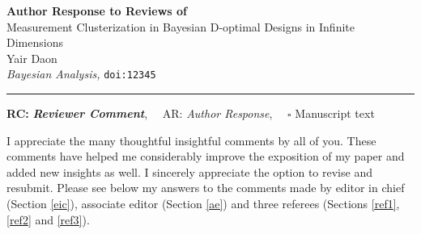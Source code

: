 \documentclass[draft]{article}
\def\papertitle{Measurement Clusterization in Bayesian D-optimal Designs in Infinite Dimensions}
\def\authors{Yair Daon}
\def\journal{Bayesian Analysis}
\def\doi{12345}
\providecommand{\lettertitle}{Author Response to Reviews of}
\providecommand{\papertitle}{Title}
\providecommand{\authors}{Authors}
\providecommand{\journal}{Journal}
\providecommand{\doi}{--}
\begin{document}
{\Large\bf \lettertitle}\\[1em]
{\huge \papertitle}\\[1em]
{\authors}\\
{\it \journal, }\texttt{doi:\doi}\\
\hrule

\hfill {\bfseries RC:} \textbf{\textit{Reviewer Comment}},\(\quad\) AR: \emph{Author Response}, \(\quad\square\) Manuscript text

I appreciate the many thoughtful insightful comments by all of
you. These comments have helped me considerably improve the exposition
of my paper and added new insights as well. I sincerely appreciate the
option to revise and resubmit. Please see below my answers to the
comments made by editor in chief (Section \ref{eic}), associate editor
(Section \ref{ae}) and three referees (Sections \ref{ref1}, \ref{ref2}
and \ref{ref3}).




    
   
    


   
    

    
    
\end{document}
